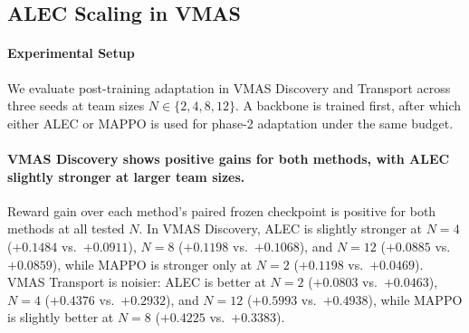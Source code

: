 \subsection{ALEC Scaling in VMAS}

\paragraph{Experimental Setup} We evaluate post-training adaptation in VMAS Discovery and Transport across three seeds at team sizes $N \in \{2,4,8,12\}$. A backbone is trained first, after which either ALEC or MAPPO is used for phase-2 adaptation under the same budget.

\paragraph{VMAS Discovery shows positive gains for both methods, with ALEC slightly stronger at larger team sizes.} Reward gain over each method's paired frozen checkpoint is positive for both methods at all tested $N$. In VMAS Discovery, ALEC is slightly stronger at $N=4$ ($+0.1484$ vs.\ $+0.0911$), $N=8$ ($+0.1198$ vs.\ $+0.1068$), and $N=12$ ($+0.0885$ vs.\ $+0.0859$), while MAPPO is stronger only at $N=2$ ($+0.1198$ vs.\ $+0.0469$). VMAS Transport is noisier: ALEC is better at $N=2$ ($+0.0803$ vs.\ $+0.0463$), $N=4$ ($+0.4376$ vs.\ $+0.2932$), and $N=12$ ($+0.5993$ vs.\ $+0.4938$), while MAPPO is slightly better at $N=8$ ($+0.4225$ vs.\ $+0.3383$).

\begin{table}[t]
\centering
\caption{VMAS Discovery mean reward by team size $N$. For each method, the paired frozen checkpoint mean is reported alongside the phase-2 adapted mean. Values are mean $\pm$ standard error; the final column reports the seed count.}
\label{tab:vmas_discovery_rewards}
\end{table}

